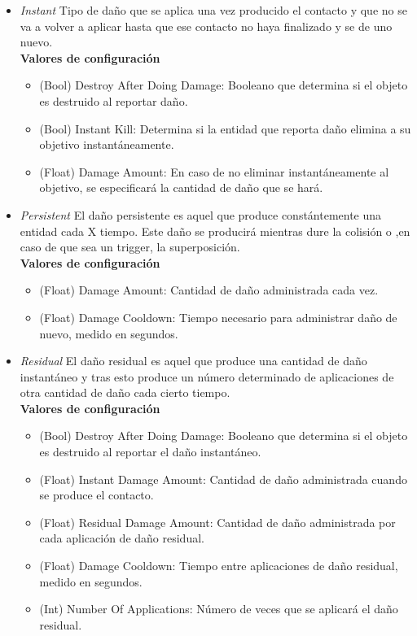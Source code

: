 \begin{itemize}
	\item \textit{Instant}
Tipo de daño que se aplica una vez producido el contacto y que no se va a volver a aplicar hasta que ese contacto no haya finalizado y se de uno nuevo.\\

\textbf{Valores de configuración}
	\begin{itemize}
	        \item (Bool) Destroy After Doing Damage: Booleano que determina si el objeto es destruido al reportar daño.
	        \item (Bool) Instant Kill: Determina si la entidad que reporta daño elimina a su objetivo instantáneamente.
	        \item (Float) Damage Amount: En caso de no eliminar instantáneamente al objetivo, se especificará la cantidad de daño que se hará.
	 \end{itemize}
	\item \textit{Persistent}
El daño persistente es aquel que produce constántemente una entidad cada X tiempo. Este daño se producirá mientras dure la colisión o ,en caso de que sea un trigger, la superposición.\\

\textbf{Valores de configuración}
	\begin{itemize}
	        \item (Float) Damage Amount: Cantidad de daño administrada cada vez.
	        \item (Float) Damage Cooldown: Tiempo necesario para administrar daño de nuevo, medido en segundos.
	\end{itemize}

	\item \textit{Residual}
El daño residual es aquel que produce una cantidad de daño instantáneo y tras esto produce un número determinado de aplicaciones de otra cantidad de daño cada cierto tiempo.\\

\textbf{Valores de configuración}
	\begin{itemize}
	        \item (Bool) Destroy After Doing Damage: Booleano que determina si el objeto es destruido al reportar el daño instantáneo.
	        \item (Float) Instant Damage Amount: Cantidad de daño administrada cuando se produce el contacto.
	        \item (Float) Residual Damage Amount: Cantidad de daño administrada por cada aplicación de daño residual.
	        \item (Float) Damage Cooldown: Tiempo entre aplicaciones de daño residual, medido en segundos.
	        \item (Int) Number Of Applications: Número de veces que se aplicará el daño residual.
	\end{itemize}
\end{itemize}


